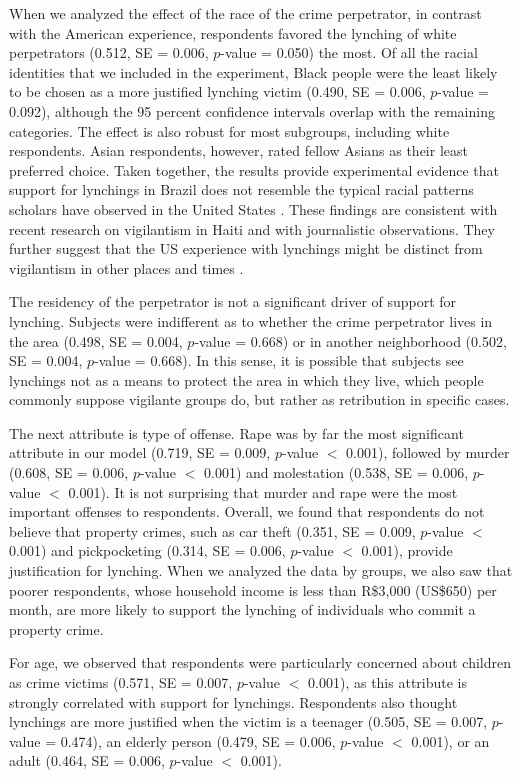 \documentclass[12pt,ansiapaper]{article}
\begin{document}
When we analyzed the effect of the race of the crime perpetrator, in contrast with the American experience, respondents favored the lynching of white perpetrators (0.512, SE = 0.006, $p$-value = 0.050) the most. Of all the racial identities that we included in the experiment, Black people were the least likely to be chosen as a more justified lynching victim (0.490, SE = 0.006, $p$-value = 0.092), although the 95 percent confidence intervals overlap with the remaining categories. The effect is also robust for most subgroups, including white respondents. Asian respondents, however, rated fellow Asians as their least preferred choice. Taken together, the results provide experimental evidence that support for lynchings in Brazil does not resemble the typical racial patterns scholars have observed in the United States \citep{dray2003hands,seguin2019national,obert2018keeping}. These findings are consistent with recent research on vigilantism in Haiti \citep{jung2020lynching} and with journalistic observations. They further suggest that the US experience with lynchings might be distinct from vigilantism in other places and times \citep{oliveira2016mob}. 

The residency of the perpetrator is not a significant driver of support for lynching. Subjects were indifferent as to whether the crime perpetrator lives in the area (0.498, SE = 0.004, $p$-value = 0.668) or in another neighborhood (0.502, SE = 0.004, $p$-value = 0.668). In this sense, it is possible that subjects see lynchings not as a means to protect the area in which they live, which people commonly suppose vigilante groups do, but rather as retribution in specific cases. 

The next attribute is type of offense. Rape was by far the most significant attribute in our model (0.719, SE = 0.009, $p$-value $<$ 0.001), followed by murder (0.608, SE = 0.006, $p$-value $<$ 0.001) and molestation (0.538, SE = 0.006, $p$-value $<$ 0.001). It is not surprising that murder and rape were the most important offenses to respondents. Overall, we found that respondents do not believe that property crimes, such as car theft (0.351, SE = 0.009, $p$-value $<$ 0.001) and pickpocketing (0.314, SE = 0.006, $p$-value $<$ 0.001), provide justification for lynching. When we analyzed the data by groups, we also saw that poorer respondents, whose household income is less than R\$3,000 (US\$650) per month, are more likely to support the lynching of individuals who commit a property crime. 

For age, we observed that respondents were particularly concerned about children as crime victims (0.571, SE = 0.007, $p$-value $<$ 0.001), as this attribute is strongly correlated with support for lynchings. Respondents also thought lynchings are more justified when the victim is a teenager (0.505, SE = 0.007, $p$-value = 0.474), an elderly person (0.479, SE = 0.006, $p$-value $<$ 0.001), or an adult (0.464, SE = 0.006, $p$-value $<$ 0.001).
\end{document}
